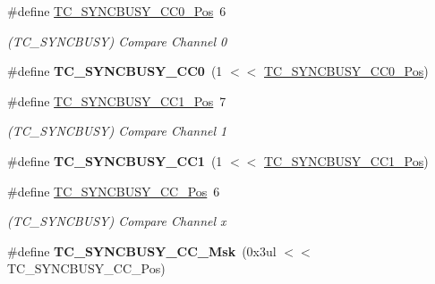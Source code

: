 \begin{DoxyCompactItemize}
\item 
\hypertarget{group___s_a_m_l21___t_c_ga9d722d964e8d53c43b151bd927cc2998}{}\#define \hyperlink{group___s_a_m_l21___t_c_ga9d722d964e8d53c43b151bd927cc2998}{T\+C\+\_\+\+S\+Y\+N\+C\+B\+U\+S\+Y\+\_\+\+C\+C0\+\_\+\+Pos}~6\label{group___s_a_m_l21___t_c_ga9d722d964e8d53c43b151bd927cc2998}

\begin{DoxyCompactList}\small\item\em (T\+C\+\_\+\+S\+Y\+N\+C\+B\+U\+S\+Y) Compare Channel 0 \end{DoxyCompactList}\item 
\hypertarget{group___s_a_m_l21___t_c_ga27678d2776c1cf767e728c74be6a9dd6}{}\#define {\bfseries T\+C\+\_\+\+S\+Y\+N\+C\+B\+U\+S\+Y\+\_\+\+C\+C0}~(1 $<$$<$ \hyperlink{group___s_a_m_l21___t_c_ga9d722d964e8d53c43b151bd927cc2998}{T\+C\+\_\+\+S\+Y\+N\+C\+B\+U\+S\+Y\+\_\+\+C\+C0\+\_\+\+Pos})\label{group___s_a_m_l21___t_c_ga27678d2776c1cf767e728c74be6a9dd6}

\item 
\hypertarget{group___s_a_m_l21___t_c_gab8f37a562a0b05b1433d6589306640de}{}\#define \hyperlink{group___s_a_m_l21___t_c_gab8f37a562a0b05b1433d6589306640de}{T\+C\+\_\+\+S\+Y\+N\+C\+B\+U\+S\+Y\+\_\+\+C\+C1\+\_\+\+Pos}~7\label{group___s_a_m_l21___t_c_gab8f37a562a0b05b1433d6589306640de}

\begin{DoxyCompactList}\small\item\em (T\+C\+\_\+\+S\+Y\+N\+C\+B\+U\+S\+Y) Compare Channel 1 \end{DoxyCompactList}\item 
\hypertarget{group___s_a_m_l21___t_c_ga8e6f0935f29066baa293d3bfd1ae6ce9}{}\#define {\bfseries T\+C\+\_\+\+S\+Y\+N\+C\+B\+U\+S\+Y\+\_\+\+C\+C1}~(1 $<$$<$ \hyperlink{group___s_a_m_l21___t_c_gab8f37a562a0b05b1433d6589306640de}{T\+C\+\_\+\+S\+Y\+N\+C\+B\+U\+S\+Y\+\_\+\+C\+C1\+\_\+\+Pos})\label{group___s_a_m_l21___t_c_ga8e6f0935f29066baa293d3bfd1ae6ce9}

\item 
\hypertarget{group___s_a_m_l21___t_c_ga6ecf52881dc715f5e01fb7c3814ac692}{}\#define \hyperlink{group___s_a_m_l21___t_c_ga6ecf52881dc715f5e01fb7c3814ac692}{T\+C\+\_\+\+S\+Y\+N\+C\+B\+U\+S\+Y\+\_\+\+C\+C\+\_\+\+Pos}~6\label{group___s_a_m_l21___t_c_ga6ecf52881dc715f5e01fb7c3814ac692}

\begin{DoxyCompactList}\small\item\em (T\+C\+\_\+\+S\+Y\+N\+C\+B\+U\+S\+Y) Compare Channel x \end{DoxyCompactList}\item 
\hypertarget{group___s_a_m_l21___t_c_ga9ac373af1ace05c13b0be75dc884970d}{}\#define {\bfseries T\+C\+\_\+\+S\+Y\+N\+C\+B\+U\+S\+Y\+\_\+\+C\+C\+\_\+\+Msk}~(0x3ul $<$$<$ T\+C\+\_\+\+S\+Y\+N\+C\+B\+U\+S\+Y\+\_\+\+C\+C\+\_\+\+Pos)\label{group___s_a_m_l21___t_c_ga9ac373af1ace05c13b0be75dc884970d}


\end{DoxyCompactItemize}

